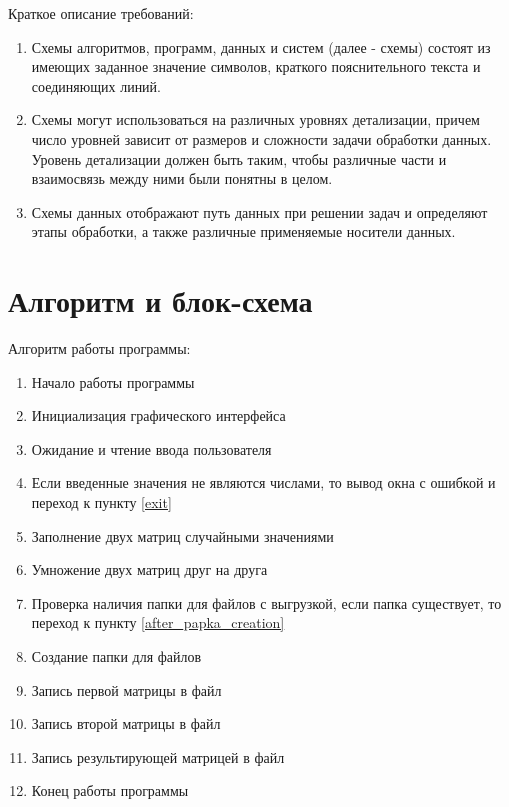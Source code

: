 \documentclass[a4paper,14pt]{extarticle}
\begin{document}
Краткое описание требований:
\begin{enumerate}
	\item Схемы алгоритмов, программ, данных и систем (далее - схемы) 
	состоят из имеющих заданное значение символов, 
	краткого пояснительного текста и соединяющих линий.
	\item Схемы могут использоваться на различных уровнях детализации, 
	причем число уровней зависит от размеров и сложности задачи обработки данных. 
	Уровень детализации должен быть таким, чтобы различные части и 
	взаимосвязь между ними были понятны в целом.
	\item Схемы данных отображают путь данных при решении задач и определяют этапы обработки, 
	а также различные применяемые носители данных.
\end{enumerate}

\section{Алгоритм и блок-схема}
Алгоритм работы программы:

\begin{enumerate}
	\item Начало работы программы
	\item Инициализация графического интерфейса
	\item Ожидание и чтение ввода пользователя
	\item Если введенные значения не являются числами, то вывод окна с ошибкой 
		и переход к пункту \ref{exit}
	\item Заполнение двух матриц случайными значениями
	\item Умножение двух матриц друг на друга
	\item Проверка наличия папки для файлов с выгрузкой, 
	если папка существует, то переход к пункту \ref{after_papka_creation}
	\item Создание папки для файлов
	\item Запись первой матрицы в файл \label{after_papka_creation}
	\item Запись второй матрицы в файл
	\item Запись результирующей матрицей в файл
	\item Конец работы программы \label{exit}
\end{enumerate}
\end{document}
